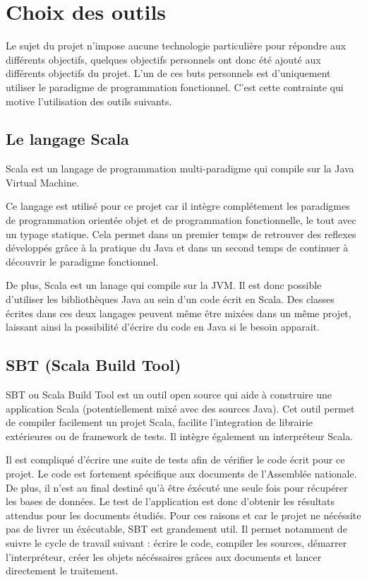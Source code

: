 \section{Choix des outils}

Le sujet du projet n'impose aucune technologie particulière pour répondre aux différents objectifs, quelques objectifs personnels ont donc été ajouté aux différents objectifs du projet. L'un de ces buts personnels est d'uniquement utiliser le paradigme de programmation fonctionnel. C'est cette contrainte qui motive l'utilisation des outils suivants.

\subsection{Le langage Scala}

Scala est un langage de programmation multi-paradigme qui compile sur la Java Virtual Machine.

Ce langage est utilisé pour ce projet car il intègre complétement les paradigmes de programmation orientée objet et de programmation fonctionnelle, le tout avec un typage statique. Cela permet dans un premier temps de retrouver des reflexes développés grâce à la pratique du Java et dans un second temps de continuer à découvrir le paradigme fonctionnel.

De plus, Scala est un lanage qui compile sur la JVM. Il est donc possible d'utiliser les bibliothèques Java au sein d'un code écrit en Scala. Des classes écrites dans ces deux langages peuvent même être mixées dans un même projet, laissant ainsi la possibilité d'écrire du code en Java si le besoin apparait.

\subsection{SBT (Scala Build Tool)}

SBT ou Scala Build Tool est un outil open source qui aide à construire une application Scala (potentiellement mixé avec des sources Java). Cet outil permet de compiler facilement un projet Scala, facilite l'integration de librairie extérieures ou de framework de tests. Il intègre également un interpréteur Scala.

Il est compliqué d'écrire une suite de tests afin de vérifier le code écrit pour ce projet. Le code est fortement spécifique aux documents de l'Assemblée nationale. De plus, il n'est au final destiné qu'à être éxécuté une seule fois pour récupérer les bases de données. Le test de l'application est donc d'obtenir les résultats attendus pour les documents étudiés.\newline
Pour ces raisons et car le projet ne nécéssite pas de livrer un éxécutable, SBT est grandement util. Il permet notamment de suivre le cycle de travail suivant : écrire le code, compiler les sources, démarrer l'interpréteur, créer les objets nécéssaires grâces aux documents et lancer directement le traitement.
